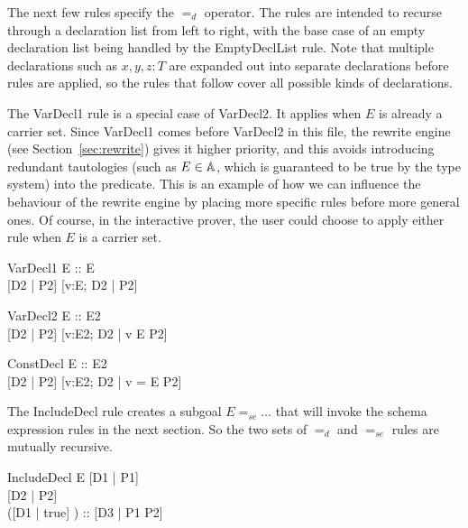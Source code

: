 \documentclass{entcs}
\newcommand{\sexprUnfoldsTo}{\mathrel{=_{se}}}
\newcommand{\declListUnfoldsTo}{\mathrel{=_d}}
\begin{document}
The next few rules specify the $\declListUnfoldsTo$ operator.
The rules are intended to recurse through a declaration list from left
to right, with the base case of an empty declaration list being handled
by the EmptyDeclList rule.  Note that multiple declarations such as
$x,y,z:T$ are expanded out into separate declarations before rules
are applied, so the rules that follow cover all possible kinds
of declarations.

The VarDecl1 rule is a special case of VarDecl2.  It applies when $E$ is
already a carrier set.  Since VarDecl1 comes before VarDecl2 in this file,
the rewrite engine (see Section~\ref{sec:rewrite}) gives it higher
priority, and this avoids introducing redundant tautologies (such as $E \in
{\mathbb A}$, which is guaranteed to be true by the type system) into the
predicate.  This is an example of how we can influence the behaviour of the
rewrite engine by placing more specific rules before more general ones.  Of
course, in the interactive prover, the user could choose to apply either
rule when $E$ is a carrier set.

\begin{zedrule}{VarDecl1}
   E :: \power E \\
   [D1 | true] \declListUnfoldsTo [D2 | P2]
\derives
   [v:E; D1 | true] \declListUnfoldsTo [v:E; D2 |  P2]
\end{zedrule}

\begin{zedrule}{VarDecl2}
   E :: \power E2 \\
   [D1 | true] \declListUnfoldsTo [D2 | P2]
\derives
   [v:E; D1 | true] \declListUnfoldsTo [v:E2; D2 |  v \in E \land P2]
\end{zedrule}

\begin{zedrule}{ConstDecl}
   E :: E2 \\
   [D1 | true] \declListUnfoldsTo [D2 | P2]
\derives
   [v==E; D1 | true] \declListUnfoldsTo [v:E2; D2 |  v = E \land P2]
\end{zedrule}

The IncludeDecl rule creates a subgoal $E \sexprUnfoldsTo \ldots$ that
will invoke the schema expression rules in the next section.  So the
two sets of $\declListUnfoldsTo$ and $\sexprUnfoldsTo$ rules are
mutually recursive.

\begin{zedrule}{IncludeDecl}
   E \sexprUnfoldsTo [D1 | P1] \\
   [D | true] \declListUnfoldsTo [D2 | P2] \\
   ([D1 | true] \land [D2 | true]) :: \power [D3 | true] 
\derives
   [E; D | true] \declListUnfoldsTo [D3 |  P1 \land P2]
\end{zedrule}
\end{document}
